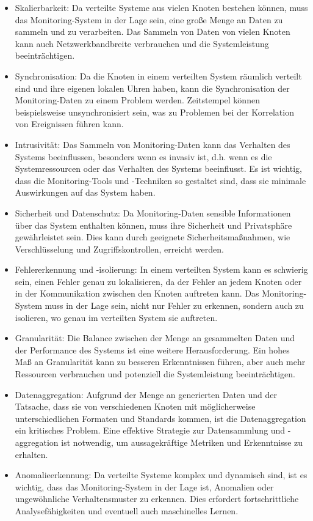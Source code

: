 \documentclass[../vs-script-first-v01.tex]{subfiles}
\begin{document}
\begin{itemize}
\item Skalierbarkeit: Da verteilte Systeme aus vielen Knoten bestehen können, muss das Monitoring-System in der Lage sein, eine große Menge an Daten zu sammeln und zu verarbeiten. Das Sammeln von Daten von vielen Knoten kann auch Netzwerkbandbreite verbrauchen und die Systemleistung beeinträchtigen.
\item Synchronisation: Da die Knoten in einem verteilten System räumlich verteilt sind und ihre eigenen lokalen Uhren haben, kann die Synchronisation der Monitoring-Daten zu einem Problem werden. Zeitstempel können beispielsweise unsynchronisiert sein, was zu Problemen bei der Korrelation von Ereignissen führen kann.
\item Intrusivität: Das Sammeln von Monitoring-Daten kann das Verhalten des Systems beeinflussen, besonders wenn es invasiv ist, d.h. wenn es die Systemressourcen oder das Verhalten des Systems beeinflusst. Es ist wichtig, dass die Monitoring-Tools und -Techniken so gestaltet sind, dass sie minimale Auswirkungen auf das System haben.
\item Sicherheit und Datenschutz: Da Monitoring-Daten sensible Informationen über das System enthalten können, muss ihre Sicherheit und Privatsphäre gewährleistet sein. Dies kann durch geeignete Sicherheitsmaßnahmen, wie Verschlüsselung und Zugriffskontrollen, erreicht werden.
\item Fehlererkennung und -isolierung: In einem verteilten System kann es schwierig sein, einen Fehler genau zu lokalisieren, da der Fehler an jedem Knoten oder in der Kommunikation zwischen den Knoten auftreten kann. Das Monitoring-System muss in der Lage sein, nicht nur Fehler zu erkennen, sondern auch zu isolieren, wo genau im verteilten System sie auftreten.
\item Granularität: Die Balance zwischen der Menge an gesammelten Daten und der Performance des Systems ist eine weitere Herausforderung. Ein hohes Maß an Granularität kann zu besseren Erkenntnissen führen, aber auch mehr Ressourcen verbrauchen und potenziell die Systemleistung beeinträchtigen.
\item Datenaggregation: Aufgrund der Menge an generierten Daten und der Tatsache, dass sie von verschiedenen Knoten mit möglicherweise unterschiedlichen Formaten und Standards kommen, ist die Datenaggregation ein kritisches Problem. Eine effektive Strategie zur Datensammlung und -aggregation ist notwendig, um aussagekräftige Metriken und Erkenntnisse zu erhalten.
\item Anomalieerkennung: Da verteilte Systeme komplex und dynamisch sind, ist es wichtig, dass das Monitoring-System in der Lage ist, Anomalien oder ungewöhnliche Verhaltensmuster zu erkennen. Dies erfordert fortschrittliche Analysefähigkeiten und eventuell auch maschinelles Lernen.
\end{itemize}
\end{document}
